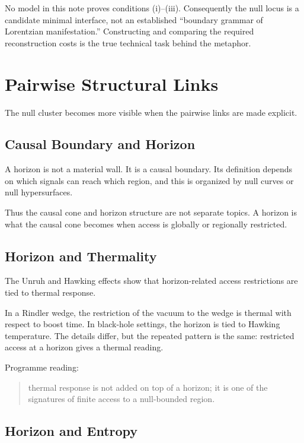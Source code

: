 \documentclass[12pt,a4paper]{article}
\theoremstyle{definition}
\theoremstyle{remark}
\begin{document}
No model in this note proves conditions (i)--(iii).  Consequently the null locus is a candidate minimal interface, not an established ``boundary grammar of Lorentzian manifestation.''  Constructing and comparing the required reconstruction costs is the true technical task behind the metaphor.

\section{Pairwise Structural Links}\label{pairwise-structural-links}

The null cluster becomes more visible when the pairwise links are made
explicit.

\subsection{Causal Boundary and
Horizon}\label{causal-boundary-and-horizon}

A horizon is not a material wall. It is a causal boundary. Its
definition depends on which signals can reach which region, and this is
organized by null curves or null hypersurfaces.

Thus the causal cone and horizon structure are not separate topics. A
horizon is what the causal cone becomes when access is globally or
regionally restricted.

\subsection{Horizon and Thermality}\label{horizon-and-thermality}

The Unruh and Hawking effects show that horizon-related access
restrictions are tied to thermal response.

In a Rindler wedge, the restriction of the vacuum to the wedge is
thermal with respect to boost time. In black-hole settings, the horizon
is tied to Hawking temperature. The details differ, but the repeated
pattern is the same: restricted access at a horizon gives a thermal
reading.

Programme reading:

\begin{quote}
thermal response is not added on top of a horizon; it is one of the
signatures of finite access to a null-bounded region.
\end{quote}

\subsection{Horizon and Entropy}\label{horizon-and-entropy}
\end{document}
